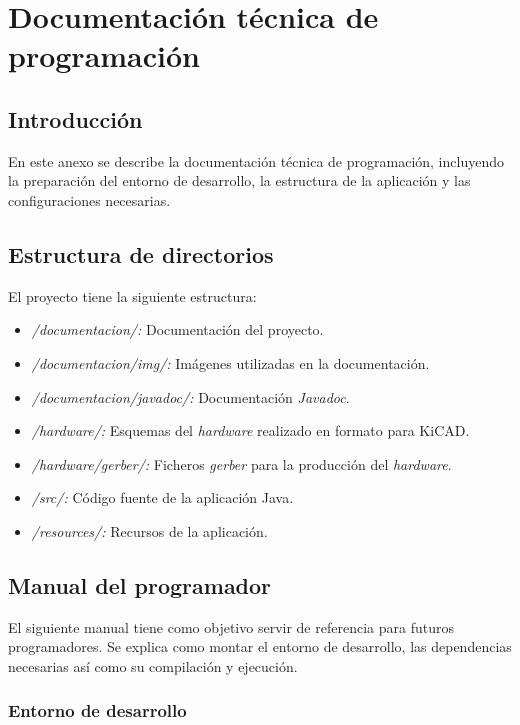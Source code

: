 \chapter[Documentación de programación]{Documentación técnica de programación}
\section{Introducción}

En este anexo se describe la documentación técnica de programación, incluyendo la preparación del entorno de desarrollo, la estructura de la aplicación y las configuraciones necesarias.

\section{Estructura de directorios}

El proyecto tiene la siguiente estructura:

\begin{itemize}
\item
\textit{/documentacion/:} Documentación del proyecto.
\item
\textit{/documentacion/img/:} Imágenes utilizadas en la documentación.
\item
\textit{/documentacion/javadoc/:} Documentación \emph{Javadoc}.
\item
\textit{/hardware/:} Esquemas del \emph{hardware} realizado en formato para KiCAD.
\item
\textit{/hardware/gerber/:} Ficheros \emph{gerber} para la producción del \emph{hardware}.
\item
\textit{/src/:} Código fuente de la aplicación Java.
\item
\textit{/resources/:} Recursos de la aplicación.

\end{itemize}


\section{Manual del programador}

El siguiente manual tiene como objetivo servir de referencia para futuros programadores. Se explica como montar el entorno de desarrollo, las dependencias necesarias así como su compilación y ejecución.

\subsection{Entorno de desarrollo}

